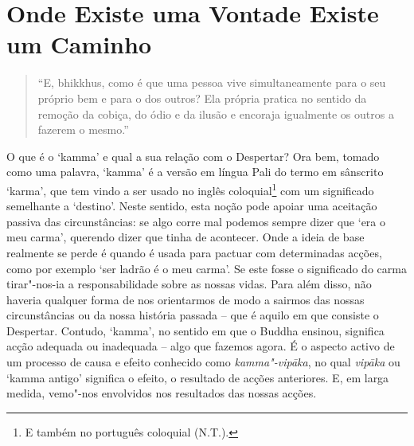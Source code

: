 
\chapter{Onde Existe uma Vontade Existe um Caminho}


\begin{quote}
  ``E, bhikkhus, como é que uma pessoa vive simultaneamente para o seu próprio
  bem e para o dos outros? Ela própria pratica no sentido da remoção da cobiça,
  do ódio e da ilusão e encoraja igualmente os outros a fazerem o mesmo.''

\end{quote}

O que é o `kamma' e qual a sua relação com o Despertar? Ora bem, tomado como uma
palavra, `kamma' é a versão em língua Pali do termo em sânscrito `karma', que
tem vindo a ser usado no inglês coloquial\footnote{E também no português
  coloquial (N.T.).} com um significado semelhante a `destino'. Neste sentido,
esta noção pode apoiar uma aceitação passiva das circunstâncias: se algo corre
mal podemos sempre dizer que `era o meu carma', querendo dizer que tinha de
acontecer. Onde a ideia de base realmente se perde é quando é usada para pactuar
com determinadas acções, como por exemplo `ser ladrão é o meu carma'. Se este
fosse o significado do carma tirar"-nos-ia a responsabilidade sobre as nossas
vidas. Para além disso, não haveria qualquer forma de nos orientarmos de modo a
sairmos das nossas circunstâncias ou da nossa história passada -- que é aquilo
em que consiste o Despertar. Contudo, `kamma', no sentido em que o Buddha
ensinou, significa acção adequada ou inadequada -- algo que fazemos agora. É o
aspecto activo de um processo de causa e efeito conhecido como
\emph{kamma"-vipāka}, no qual \emph{vipāka} ou `kamma antigo' significa o efeito,
o resultado de acções anteriores. E, em larga medida, vemo"-nos envolvidos nos
resultados das nossas acções.

